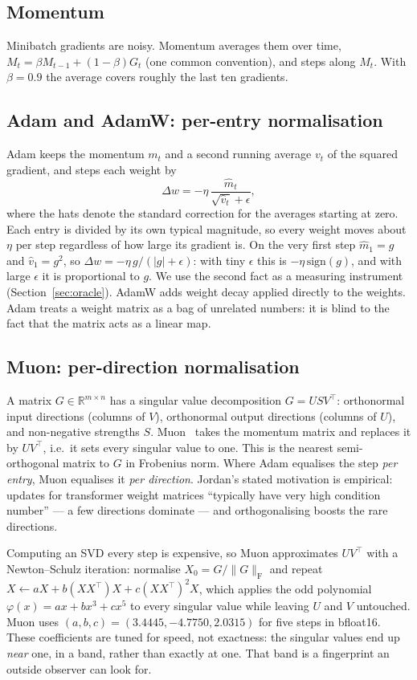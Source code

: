 \documentclass[11pt]{article}
\newcommand{\fro}{\mathrm{F}}
\begin{document}
\subsection{Momentum}
Minibatch gradients are noisy. Momentum averages them over time,
$M_t=\beta M_{t-1}+(1-\beta)G_t$ (one common convention), and steps along $M_t$. With
$\beta=0.9$ the average covers roughly the last ten gradients.

\subsection{Adam and AdamW: per-entry normalisation}
Adam keeps the momentum $m_t$ and a second running average $v_t$ of the squared gradient, and
steps each weight by
\[
\Delta w = -\eta\,\frac{\hat m_t}{\sqrt{\hat v_t}+\epsilon},
\]
where the hats denote the standard correction for the averages starting at zero. Each entry is
divided by its own typical magnitude, so every weight moves about $\eta$ per step regardless of how
large its gradient is. On the very first step $\hat m_1=g$ and $\hat v_1=g^2$, so
$\Delta w=-\eta\, g/(|g|+\epsilon)$: with tiny $\epsilon$ this is $-\eta\,\mathrm{sign}(g)$, and
with large $\epsilon$ it is proportional to $g$. We use the second fact as a measuring instrument
(Section~\ref{sec:oracle}). AdamW adds weight decay applied directly to the weights. Adam treats a
weight matrix as a bag of unrelated numbers: it is blind to the fact that the matrix acts as a
linear map.

\subsection{Muon: per-direction normalisation}
A matrix $G\in\mathbb{R}^{m\times n}$ has a singular value decomposition $G=USV^\top$: orthonormal
input directions (columns of $V$), orthonormal output directions (columns of $U$), and
non-negative strengths $S$. Muon~\cite{jordan2024muon} takes the momentum matrix and replaces it
by $UV^\top$, i.e.\ it sets every singular value to one. This is the nearest semi-orthogonal
matrix to $G$ in Frobenius norm. Where Adam equalises the step \emph{per entry}, Muon equalises it
\emph{per direction}. Jordan's stated motivation is empirical: updates for transformer weight
matrices ``typically have very high condition number'' --- a few directions dominate --- and
orthogonalising boosts the rare directions.

Computing an SVD every step is expensive, so Muon approximates $UV^\top$ with a Newton--Schulz
iteration: normalise $X_0=G/\|G\|_\fro$ and repeat $X\leftarrow aX+b(XX^\top)X+c(XX^\top)^2X$,
which applies the odd polynomial $\varphi(x)=ax+bx^3+cx^5$ to every singular value while leaving
$U$ and $V$ untouched. Muon uses $(a,b,c)=(3.4445,-4.7750,2.0315)$ for five steps in bfloat16.
These coefficients are tuned for speed, not exactness: the singular values end up \emph{near} one,
in a band, rather than exactly at one. That band is a fingerprint an outside observer can look for.
\end{document}
